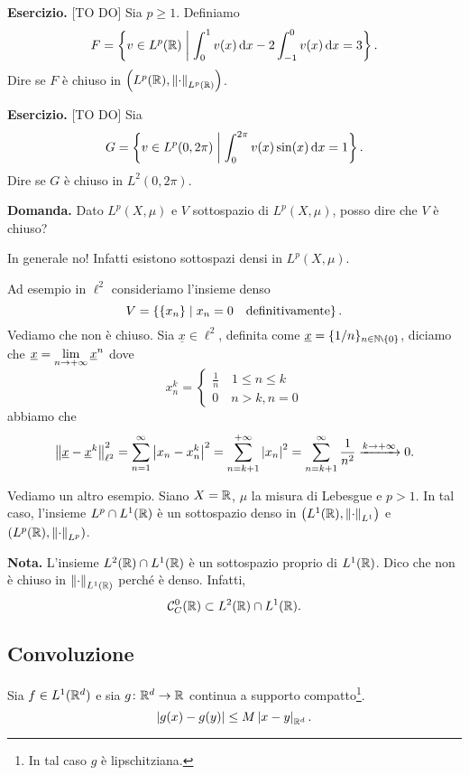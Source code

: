 \textbf{Esercizio.} [TO DO] Sia $p \geq 1$. Definiamo 
%
$$
F = \left\{ v \in L^p(\mathbb R) \;\middle|\; \int_{0}^{1} v(x) \,\mathrm{d} x - 2 \int_{-1}^{0} v(x) \,\mathrm{d} x = 3 \right\}.
$$
%
Dire se $F$ è chiuso in $\left( L^p(\mathbb R), \left\lVert \cdot  \right\rVert_{L^p(\mathbb R)} \right)$.


\textbf{Esercizio.} [TO DO] Sia 
%
$$
G = \left\{ v \in L^p(0,2\pi) \;\middle|\; \int_{0}^{2\pi} v(x) \sin(x) \,\mathrm{d} x = 1  \right\}.
$$
%
Dire se $G$ è chiuso in $L^2(0,2\pi)$.

\textbf{Domanda.} Dato $L^p (X,\mu)$ e $V$ sottospazio di $L^p(X,\mu)$, posso dire che $V$ è chiuso?

In generale no! Infatti esistono sottospazi densi in $L^p(X,\mu)$.

Ad esempio in $\ell^2$ consideriamo l'insieme denso
%
$$
V = \left\{ \left\{ x_n \right\} \;\middle|\; x_n = 0 \quad \text{definitivamente}  \right\}.
$$
%
Vediamo che non è chiuso. Sia $\underline{x} \in \ell^2$, definita come $\underline{x} = \{ 1 / n \}_{n \in \N \setminus \{0 \}}$, diciamo che $\displaystyle \underline{x} = \lim_{n \to +\infty} \underline{x}^n$ dove
%
$$
x_n^k = 
\begin{cases}
\frac{1}{n} \quad 1 \leq n \leq k \\
0 \quad n > k, n = 0
\end{cases} 
$$
%
abbiamo che
%
$$
\left\lVert \underline{x} - \underline{x}^k \right\rVert_{\ell^2}^2 = \sum_{n=1}^{\infty} \left| x_n -x_n^k \right|^2 = \sum_{n = k+1}^{+\infty} \left| x_n \right|^2 = \sum_{n = k+1}^{\infty} \frac{1}{n^2} \xrightarrow{k \to +\infty} 0.   
$$
%

Vediamo un altro esempio. Siano $X = \mathbb R$, $\mu$ la misura di Lebesgue e $p > 1$.
In tal caso, l'insieme $L^p \cap L^1 (\mathbb R)$ è un sottospazio denso in $\left( L^1(\mathbb R), \left\lVert \cdot  \right\rVert_{L^1} \right)$ e $\left( L^p(\mathbb R), \left\lVert \cdot  \right\rVert_{L^p} \right)$.

\textbf{Nota.} L'insieme $L^2(\mathbb R) \cap L^1(\mathbb R)$ è un sottospazio proprio di $L^1(\mathbb R)$. Dico che non è chiuso in $\left\lVert \cdot  \right\rVert_{L^1(\mathbb R)}$ perché è denso.
Infatti, 
%
$$
\mathcal{C}_C^0(\mathbb R) \subset L^2(\mathbb R) \cap L^1(\mathbb R).
$$
%

\subsection{Convoluzione}

Sia $f \in L^1(\mathbb R^d)$ e sia $g \colon \mathbb R^d \to \mathbb R$ continua a supporto compatto\footnote{In tal caso $g$ è lipschitziana.}.
%
$$
\left| g(x) - g(y) \right| \leq M \left| x - y \right|_{\mathbb R^d}.
$$
%

